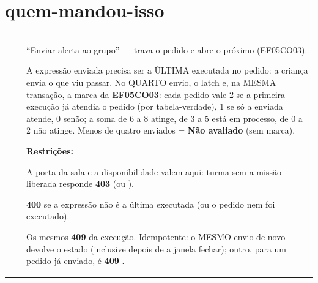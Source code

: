 \section{quem-mandou-isso}

\begin{tabularx}{\linewidth}{@{}L{40mm}L{24mm}X@{}}
\toprule
\headrow {} &  & \\
\midrule
\endhead
{} &  & \enquote{Enviar alerta ao grupo} --- trava o pedido e abre o próximo (EF05CO03).\par A expressão enviada precisa ser a ÚLTIMA executada no pedido: a criança envia o que viu passar. No QUARTO envio, o latch  e, na MESMA transação, a marca da \textbf{EF05CO03}: cada pedido vale 2 se a primeira execução já atendia o pedido (por tabela-verdade), 1 se só a enviada atende, 0 senão; a soma de 6 a 8 atinge, de 3 a 5 está em processo, de 0 a 2 não atinge. Menos de quatro enviados = \textbf{Não avaliado} (sem marca).\par \textbf{Restrições:}\par \hspace*{1em}\textbullet{} A porta da sala  e a disponibilidade  valem aqui: turma sem a missão liberada responde \textbf{403}  (ou ).\par \hspace*{1em}\textbullet{} \textbf{400}  se a expressão não é a última executada (ou o pedido nem foi executado).\par \hspace*{1em}\textbullet{} Os mesmos \textbf{409} da execução. Idempotente: o MESMO envio de novo devolve o estado (inclusive depois de a janela fechar); outro, para um pedido já enviado, é \textbf{409} .\\

\end{tabularx}

